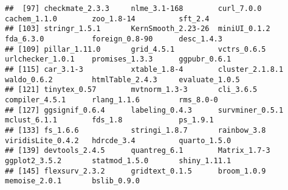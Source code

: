 \documentclass[
]{article}
\begin{document}
\begin{verbatim}
##  [97] checkmate_2.3.3     nlme_3.1-168        curl_7.0.0          cachem_1.1.0        zoo_1.8-14          sft_2.4            
## [103] stringr_1.5.1       KernSmooth_2.23-26  miniUI_0.1.2        fda_6.3.0           foreign_0.8-90      desc_1.4.3         
## [109] pillar_1.11.0       grid_4.5.1          vctrs_0.6.5         urlchecker_1.0.1    promises_1.3.3      ggpubr_0.6.1       
## [115] car_3.1-3           xtable_1.8-4        cluster_2.1.8.1     waldo_0.6.2         htmlTable_2.4.3     evaluate_1.0.5     
## [121] tinytex_0.57        mvtnorm_1.3-3       cli_3.6.5           compiler_4.5.1      rlang_1.1.6         rms_8.0-0          
## [127] ggsignif_0.6.4      labeling_0.4.3      survminer_0.5.1     mclust_6.1.1        fds_1.8             ps_1.9.1           
## [133] fs_1.6.6            stringi_1.8.7       rainbow_3.8         viridisLite_0.4.2   hdrcde_3.4          quarto_1.5.0       
## [139] devtools_2.4.5      quantreg_6.1        Matrix_1.7-3        ggplot2_3.5.2       statmod_1.5.0       shiny_1.11.1       
## [145] flexsurv_2.3.2      gridtext_0.1.5      broom_1.0.9         memoise_2.0.1       bslib_0.9.0
\end{verbatim}
\end{document}
